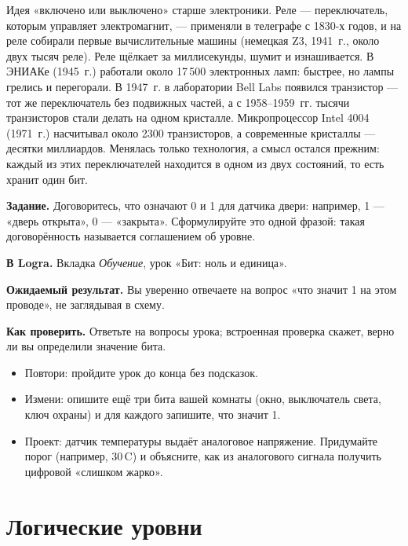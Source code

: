 \begin{infobox}
Идея «включено или выключено» старше электроники. Реле --- переключатель,
которым управляет электромагнит, --- применяли в телеграфе с 1830-х годов, и
на реле собирали первые вычислительные машины (немецкая Z3, 1941~г., около
двух тысяч реле). Реле щёлкает за миллисекунды, шумит и изнашивается. В
ЭНИАКе (1945~г.) работали около 17\,500 электронных ламп: быстрее, но лампы
грелись и перегорали. В 1947~г. в лаборатории Bell Labs появился транзистор
--- тот же переключатель без подвижных частей, а с 1958--1959~гг. тысячи
транзисторов стали делать на одном кристалле. Микропроцессор Intel 4004
(1971~г.) насчитывал около 2300 транзисторов, а современные кристаллы ---
десятки миллиардов. Менялась только технология, а смысл остался прежним:
каждый из этих переключателей находится в одном из двух состояний, то есть
хранит один бит.
\end{infobox}

\begin{diybox}
\textbf{Задание.} Договоритесь, что означают 0 и 1 для датчика двери:
например, 1 --- «дверь открыта», 0 --- «закрыта». Сформулируйте это одной
фразой: такая договорённость называется соглашением об уровне.\par
\textbf{В Logra.} Вкладка \emph{Обучение}, урок «Бит: ноль и единица».\par
\textbf{Ожидаемый результат.} Вы уверенно отвечаете на вопрос «что значит 1
на этом проводе», не заглядывая в схему.\par
\textbf{Как проверить.} Ответьте на вопросы урока; встроенная проверка
скажет, верно ли вы определили значение бита.
\begin{itemize}[leftmargin=3.4em,labelwidth=3em,labelsep=0.4em,align=left]
  \item[\stars{1}] Повтори: пройдите урок до конца без подсказок.
  \item[\stars{2}] Измени: опишите ещё три бита вашей комнаты (окно, выключатель
    света, ключ охраны) и для каждого запишите, что значит 1.
  \item[\stars{3}] Проект: датчик температуры выдаёт аналоговое напряжение.
    Придумайте порог (например, 30\,\textdegree C) и объясните, как из
    аналогового сигнала получить цифровой «слишком жарко».
\end{itemize}
\end{diybox}

\section{Логические уровни}


